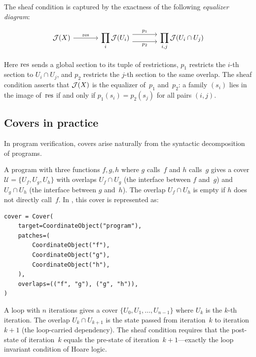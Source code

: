 \documentclass[11pt]{article}
\begin{document}
The sheaf condition is captured by the exactness of the following
\emph{equalizer diagram}:

\begin{equation}\label{eq:equalizer}
\begin{tikzcd}[column sep=large]
\J(X) \ar[r, "\res"] &
\displaystyle\prod_{i} \J(U_i)
  \ar[r, shift left=1.2ex, "p_1"]
  \ar[r, shift right=1.2ex, "p_2"'] &
\displaystyle\prod_{i,j} \J(U_i \cap U_j)
\end{tikzcd}
\end{equation}

\noindent
Here $\mathrm{res}$ sends a global section to its tuple of restrictions, $p_1$
restricts the $i$-th section to $U_i \cap U_j$, and $p_2$ restricts the
$j$-th section to the same overlap.  The sheaf condition asserts that $\mathcal{J}(X)$
is the equalizer of~$p_1$ and~$p_2$: a family $(s_i)$ lies in the image
of~$\mathrm{res}$ if and only if $p_1(s_i) = p_2(s_j)$ for all pairs $(i,j)$.

\subsection{Covers in practice}

In program verification, covers arise naturally from the syntactic
decomposition of programs.

\begin{example}\label{ex:function-cover}
A program with three functions $f, g, h$ where $g$ calls~$f$ and $h$
calls~$g$ gives a cover $\mathcal{U} = \{U_f, U_g, U_h\}$ with overlaps
$U_f \cap U_g$ (the interface between $f$ and~$g$) and $U_g \cap U_h$
(the interface between $g$ and~$h$).  The overlap $U_f \cap U_h$ is empty
if $h$ does not directly call~$f$.  In \JuGeo{}, this cover is
represented as:
\begin{lstlisting}[caption={Cover for a three-function program.}]
cover = Cover(
    target=CoordinateObject("program"),
    patches=(
        CoordinateObject("f"),
        CoordinateObject("g"),
        CoordinateObject("h"),
    ),
    overlaps=(("f", "g"), ("g", "h")),
)
\end{lstlisting}
\end{example}

\begin{example}\label{ex:loop-cover}
A loop with $n$ iterations gives a cover $\{U_0, U_1, \ldots, U_{n-1}\}$
where $U_k$ is the $k$-th iteration.  The overlap $U_k \cap U_{k+1}$ is
the state passed from iteration~$k$ to iteration~$k+1$ (the loop-carried
dependency).  The sheaf condition requires that the post-state of
iteration~$k$ equals the pre-state of iteration~$k+1$---exactly the
loop invariant condition of Hoare logic.
\end{example}
\end{document}
